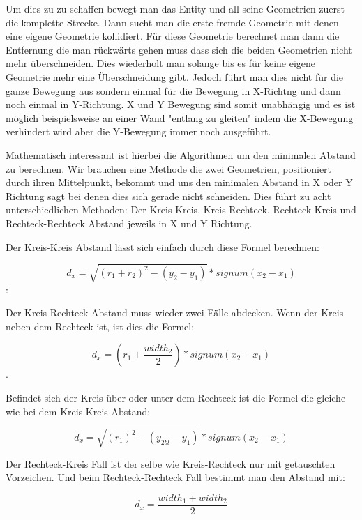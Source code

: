 Um dies zu zu schaffen bewegt man das Entity und all seine Geometrien zuerst die komplette Strecke. Dann sucht man die erste fremde Geometrie mit denen eine eigene Geometrie kollidiert. Für diese Geometrie berechnet man dann die Entfernung die man rückwärts gehen muss dass sich die beiden Geometrien nicht mehr überschneiden. Dies wiederholt man solange bis es für keine eigene Geometrie mehr eine Überschneidung gibt. Jedoch führt man dies nicht für die ganze Bewegung aus sondern einmal für die Bewegung in X-Richtng und dann noch einmal in Y-Richtung. X und Y Bewegung sind somit unabhängig und es ist möglich beispielsweise an einer Wand "entlang zu gleiten" indem die X-Bewegung verhindert wird aber die Y-Bewegung immer noch ausgeführt.

Mathematisch interessant ist hierbei die Algorithmen um den minimalen Abstand zu berechnen. Wir brauchen eine Methode die zwei Geometrien, positioniert durch ihren Mittelpunkt, bekommt und uns den minimalen Abstand in X oder Y Richtung sagt bei denen dies sich gerade nicht schneiden. Dies führt zu acht unterschiedlichen Methoden: Der Kreis-Kreis, Kreis-Rechteck, Rechteck-Kreis und Rechteck-Rechteck Abstand jeweils in X und Y Richtung.

Der Kreis-Kreis Abstand lässt sich einfach durch diese Formel berechnen:

$$d_x = \sqrt{(r_1 + r_2)^2 - (y_2 - y_1)} * signum(x_2 - x_1)$$:


Der Kreis-Rechteck Abstand muss wieder zwei Fälle abdecken. Wenn der Kreis neben dem Rechteck ist, ist dies die Formel:

$$d_x = (r_1 + \frac{width_2}{2}) * signum(x_2 - x_1)$$. 

Befindet sich der Kreis über oder unter dem Rechteck ist die Formel die gleiche wie bei dem Kreis-Kreis Abstand:

$$d_x = \sqrt{(r_1)^2 - (y_{2bl} - y_1)} * signum(x_2 - x_1)$$


Der Rechteck-Kreis Fall ist der selbe wie Kreis-Rechteck nur mit getauschten Vorzeichen. Und beim Rechteck-Rechteck Fall bestimmt man den Abstand mit:

$$d_x = \frac{width_1 + width_2}{2}$$


